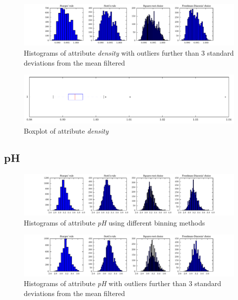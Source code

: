 \documentclass{report}
\begin{document}
\begin{figure}[H]
\includegraphics[width=\textwidth]{histograms/density_filtered.pdf}
\caption{Histograms of attribute \emph{density} with outliers further than 3 standard deviations from the mean filtered}
\end{figure}

\begin{figure}[H]
\includegraphics[width=\textwidth]{boxplots/density.pdf}
\caption{Boxplot of attribute \emph{density}}\end{figure}

\newpage\subsection{pH}
\begin{figure}[H]
\includegraphics[width=\textwidth]{histograms/pH.pdf}
\caption{Histograms of attribute \emph{pH} using different binning methods}\end{figure}

\begin{figure}[H]
\includegraphics[width=\textwidth]{histograms/pH_filtered.pdf}
\caption{Histograms of attribute \emph{pH} with outliers further than 3 standard deviations from the mean filtered}
\end{figure}
\end{document}
